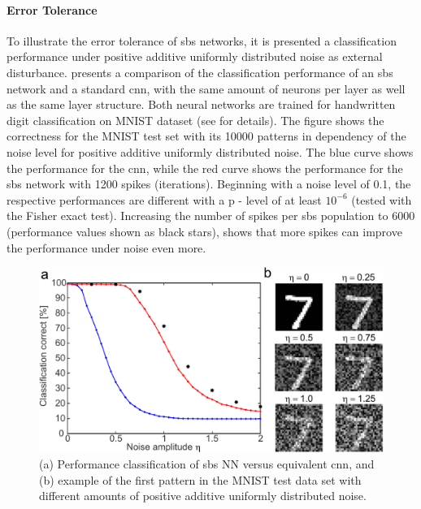 \paragraph{Error Tolerance}

To illustrate the error tolerance of \gls{sbs} networks, it is presented a classification performance under positive additive uniformly distributed noise as external disturbance.  presents a comparison of the classification performance of an \gls{sbs} network and a standard \gls{cnn}, with the same amount of
neurons per layer as well as the same layer structure. Both neural networks are trained for handwritten digit classification on MNIST dataset \cite{lecun1998mnist} (see \cite{rotermund2019Backpropagation} for details). The figure shows the correctness for the MNIST test set with its \num[group-separator={,}]{10000} patterns in dependency of the noise level for positive additive
uniformly distributed noise. The blue curve shows the performance for
the \gls{cnn}, while the red curve shows the performance for
the \gls{sbs} network with \num[group-separator={,}]{1200} spikes (iterations). Beginning
with a noise level of 0.1, the respective performances are different
with a p - level of at least $10^{-6}$ (tested with the Fisher exact
test). Increasing the number of spikes per \gls{sbs} population to \num[group-separator={,}]{6000}
(performance values shown as black stars), shows that more spikes can
improve the performance under noise even more.

\begin{figure}
	\centering
	\includegraphics[width=0.5\columnwidth]{./chapters/sbs_accelerator/figures/sbs_robustnes.pdf}
	\caption{(a) Performance classification of \gls{sbs} NN versus equivalent \gls{cnn}, and (b) example of the first pattern in the MNIST test data set with different amounts of positive additive uniformly distributed noise.}
	\label{fig:robustnes_sbs}
\end{figure}
\FloatBarrier

